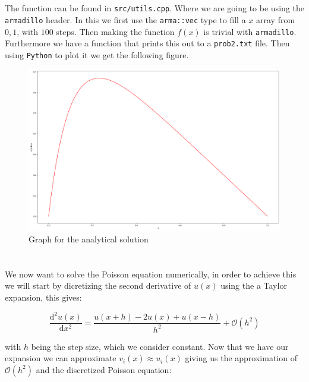 \documentclass[a4paper,10pt,english]{article}
\newcommand{\dd}[1]{\mathrm{d}#1}
\begin{document}
			\section{} %
			
			The function can be found in \lstinline{src/utils.cpp}.
			Where we are going to be using the \lstinline{armadillo} header.
			In this we first use the \lstinline{arma::vec} type to fill a $x$ array from $0, 1$,
			with $100$ steps.
			Then making the function $f(x)$ is trivial with \lstinline{armadillo}.
			Furthermore we have a function that prints this out to a \lstinline{prob2.txt} file.
			Then using \lstinline{Python} to plot it we get the following figure.
			
			\begin{figure}[H]
				\centering
				\includegraphics[width=1.0\linewidth]{figures/prob2.png}
				\caption{Graph for the analytical solution\label{fig:prob2}}
			\end{figure}
			
			\section{} %
			
			We now want to solve the Poisson equation numerically, in order to achieve this
			we will start by dicretizing the second derivative of $u(x)$ using the a Taylor
			expansion, this gives:
			
			\begin{equation}
				\frac{\dd{^{2}u(x)}}{\dd{x}^2} = \frac{u(x+h) - 2u(x) + u(x-h)}{h^2} + \mathcal{O}(h^2)
			\end{equation}
			
			with $h$ being the step size, which we consider constant. Now that we have our
			expansion we can approximate $v_i(x) \approx u_i(x)$ giving us the approximation
			of $\mathcal{O}(h^2)$ and the discretized Poisson equation:
			
\end{document}
